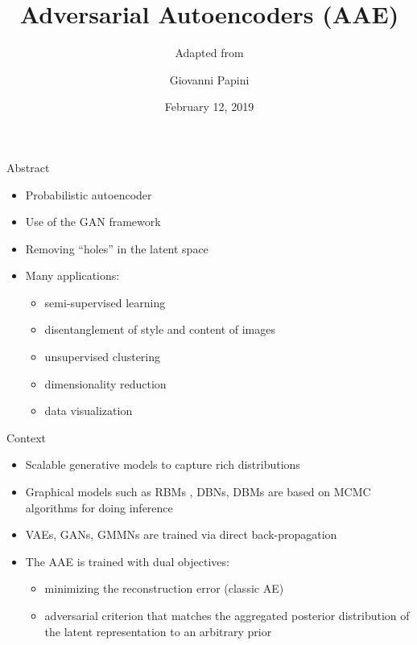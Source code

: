 \documentclass[10pt]{beamer}
\begin{document}
\author{Giovanni Papini}
\title{Adversarial Autoencoders (AAE)}
\subtitle{Adapted from \cite{makhzani2015adversarial}}
\date{February 12, 2019}
\subject{autoencoders, neural network, AI}

\begin{frame}[plain]
\maketitle
\end{frame}

\begin{frame}{Abstract}
\begin{itemize}
  \item Probabilistic autoencoder
  \item Use of the GAN framework
  \item Removing ``holes'' in the latent space
  \item Many applications:
  \begin{itemize}
    \item semi-supervised learning
    \item disentanglement of style and content of images
    \item unsupervised clustering
    \item dimensionality reduction
    \item data visualization
  \end{itemize}
\end{itemize}
\end{frame}

\begin{frame}{Context}
\begin{itemize}
  \item Scalable generative models to capture rich distributions
  \item Graphical models such as RBMs , DBNs, DBMs are based on MCMC algorithms for doing inference
  \item VAEs, GANs, GMMNs are trained via direct back-propagation
  \item The AAE is trained with dual objectives:
  \begin{itemize}
    \item minimizing the reconstruction error (classic AE)
    \item adversarial criterion that matches the aggregated posterior distribution of the latent representation to an arbitrary prior
  \end{itemize}
\end{itemize}
\end{frame}
\end{document}
